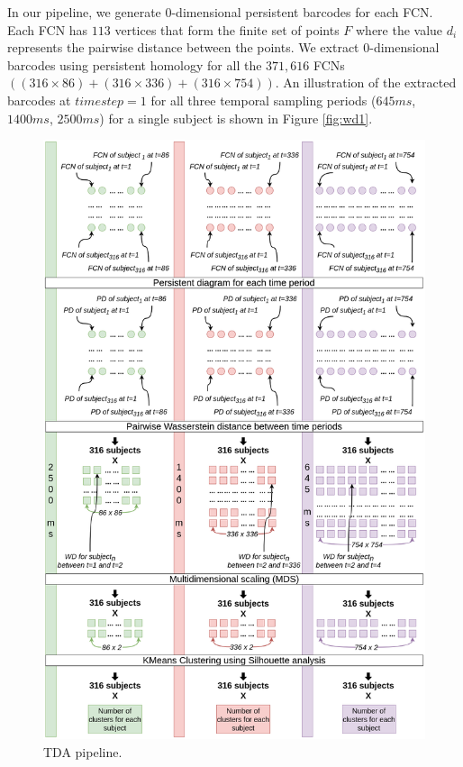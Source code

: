 In our pipeline, we generate 0-dimensional persistent barcodes for each FCN. Each FCN has $113$ vertices that form the finite set of points $F$ where the value $d_i$ represents the pairwise distance between the points. We extract 0-dimensional barcodes using persistent homology for all the $371,616$ FCNs $((316 \times 86) + (316 \times 336) + (316 \times 754))$. An illustration of the extracted barcodes at $timestep=1$ for all three temporal sampling periods ($645ms$, $1400ms$, $2500ms$) for a single subject is shown in Figure \ref{fig:wd1}.


\begin{figure}[!ht]
	\centering	
	\includegraphics[height=0.9\textheight]{figures/tda_pipeline.png}
	\caption{TDA pipeline.}
	\label{fig:tda_pipeline}
\end{figure}

